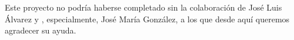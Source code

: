 \section*{}
\label{chap:prologo}

Este proyecto no podría haberse completado sin la colaboración de José Luis Álvarez y , especialmente, José María González, a los que desde 
aquí queremos agradecer su ayuda.